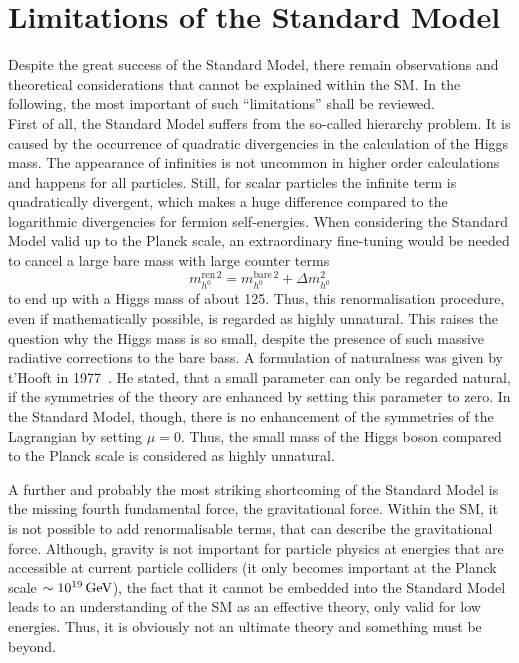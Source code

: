 \section{Limitations of the Standard Model}
\label{sec:Limitations}
Despite the great success of the Standard Model, there remain observations and theoretical considerations that cannot be explained within the SM.
In the following, the most important of such ``limitations'' shall be reviewed.\\

First of all, the Standard Model suffers from the so-called hierarchy problem.
It is caused by the occurrence of quadratic divergencies in the calculation of the Higgs mass.
The appearance of infinities is not uncommon in higher order calculations and happens for all particles. 
Still, for scalar particles the infinite term is quadratically divergent, which makes a huge difference compared to the logarithmic divergencies for fermion self-energies. 
When considering the Standard Model valid up to the Planck scale, an extraordinary fine-tuning would be needed to cancel a large bare mass with large counter terms 
\begin{equation}
 m^{\text{ren}\,2}_{h^0} = m_{h^0}^{\text{bare}\,2} + \Delta m^2_{h^0}
\end{equation}
to end up with a Higgs mass of about 125\gev.
Thus, this renormalisation procedure, even if mathematically possible, is regarded as highly unnatural.
This raises the question why the Higgs mass is so small, despite the presence of such massive radiative corrections to the bare bass.
A formulation of naturalness was given by t'Hooft in 1977~\cite{bib:Naturalness_tHooft}. 
He stated, that a small parameter can only be regarded natural, if the symmetries of the theory are enhanced by setting this parameter to zero.
In the Standard Model, though, there is no enhancement of the symmetries of the Lagrangian by setting $\mu=0$.
Thus, the small mass of the Higgs boson compared to the Planck scale is considered as highly unnatural.

A further and probably the most striking shortcoming of the Standard Model is the missing fourth fundamental force, the gravitational force.
Within the SM, it is not possible to add renormalisable terms, that can describe the gravitational force.
Although, gravity is not important for particle physics at energies that are accessible at current particle colliders (it only becomes important at the Planck scale $\sim 10^{19}\,\text{Ge}\kern-0.06667em\text{V}$), the fact that it cannot be embedded into the Standard Model leads to an understanding of the SM as an effective theory, only valid for low energies.
Thus, it is obviously not an ultimate theory and something must be beyond.

